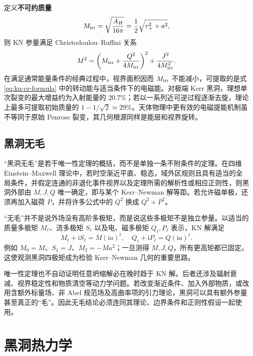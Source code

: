 定义\textbf{不可约质量}
\begin{equation}
    M_{\rm irr}=\sqrt{\frac{A_H}{16\pi}}
      =\frac12\sqrt{r_+^2+a^2},
\end{equation}
则 KN 参量满足 Christodoulou--Ruffini 关系
\begin{equation}\label{eq:kn-cr-formula}
    M^2=\left(M_{\rm irr}+\frac{Q^2}{4M_{\rm irr}}\right)^2
       +\frac{J^2}{4M_{\rm irr}^2}.
\end{equation}
在满足通常能量条件的经典过程中，视界面积因而 $M_{\rm irr}$ 不能减小，可提取的是式 \eqref{eq:kn-cr-formula} 中的转动能与适当条件下的电磁能。对极端 Kerr 黑洞，理想单次裂变的最大增益约为入射能量的 $20.7\%$；若以一系列近可逆过程逐渐去旋，理论上最多可提取初始质量的 $1-1/\sqrt2\simeq29\%$。天体物理中更有效的电磁提能机制虽不等同于原始 Penrose 裂变，其几何根源同样是能层和视界旋转。

\subsection{黑洞无毛}

“黑洞无毛”是若干唯一性定理的概括，而不是单独一条不附条件的定理。在四维 Einstein--Maxwell 理论中，若时空渐近平直、稳态，域外区规则且具有适当的全局条件，并假定连通的非退化事件视界以及定理所需的解析性或相应正则性，则黑洞外部由 $M,J,Q$ 唯一确定，即与某个 Kerr--Newman 解等距。若允许磁单极，还须再加入磁荷 $P$，并将许多公式中的 $Q^2$ 换成 $Q^2+P^2$。

“无毛”并不是说外场没有高阶多极矩，而是说这些多极矩不是独立参量。以适当的质量多极矩 $M_\ell$、流多极矩 $S_\ell$ 以及电、磁多极矩 $Q_\ell,P_\ell$ 表示，KN 解满足
\begin{equation}
    M_\ell+\mathrm{i}S_\ell=M(\mathrm{i}a)^\ell,
    \quad
    Q_\ell+\mathrm{i}P_\ell=Q(\mathrm{i}a)^\ell .
\end{equation}
例如 $M_0=M$、$S_1=J$、$M_2=-Ma^2$；一旦测得 $M,J,Q$，所有更高矩都已固定。这使观测黑洞四极矩成为检验 Kerr--Newman 几何的重要思路。

唯一性定理也不自动证明任意坍缩解必在晚时趋于 KN 解。后者还涉及辐射衰减、视界稳定性和物质清空等动力学问题。若改变渐近条件、加入外部物质，或改用含额外标量场、非 Abel 规范场及高曲率项的引力理论，黑洞可以具有额外参量甚至真正的“毛”。因此无毛结论必须连同其理论、边界条件和正则性假设一起使用。

\section{黑洞热力学}

